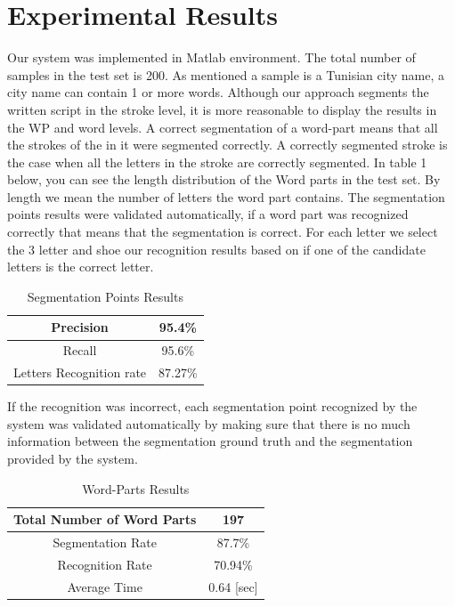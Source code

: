\documentclass[12pt,journal,compsoc]{IEEEtran}
\begin{document}
\section{Experimental Results}
Our system was implemented in Matlab environment. The total number of samples in the test set is 200. As mentioned a sample is a Tunisian city name, a city name can contain 1 or more words. 
Although our approach segments the written script in the stroke level, it is more reasonable to display the results in the WP and word levels. A correct segmentation of a word-part means that all the strokes of the in it were segmented correctly. A correctly segmented stroke is the case when all the letters in the stroke are correctly segmented.  In table 1 below, you can see the length distribution of the Word parts in the test set. By length we mean the number of letters the word part contains.
The segmentation points results were validated automatically, if a word part was recognized correctly that means that the segmentation is correct. For each letter we select the 3 letter and shoe our recognition results based on if one of the candidate letters is the correct letter.


\begin{table}[h]
\caption{Segmentation Points Results}
\begin{tabular}{ | c | c | }
  \hline                     
   Precision & 95.4\% \\ 
 \hline
  Recall &  95.6\% \\ 
 \hline
  Letters Recognition rate & 87.27\% \\
\hline
\end{tabular}
\centering
\label{table:sp_results} 
\end{table}
If the recognition was incorrect, each segmentation point recognized by the system was validated automatically by making sure that there is no much information between the segmentation ground truth and the segmentation provided by the system.

\begin{table}[h]
\caption{Word-Parts Results}
\begin{tabular}{ | c | c | }
  \hline                     
    Total Number of Word Parts & 197 \\ 
  \hline
  Segmentation Rate &  87.7\% \\ 
 \hline
  Recognition Rate &  70.94\% \\ 
 \hline
  Average Time & 0.64 [sec] \\
\hline
\end{tabular}
\centering
\label{table:wp_results} 
\end{table}
\end{document}
